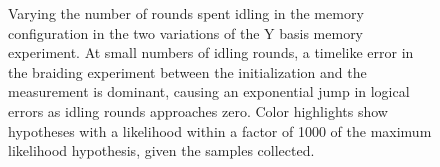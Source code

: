 \documentclass[onecolumn,unpublished,a4paper]{quantumarticle}
\theoremstyle{definition}
\theoremstyle{definition}
\theoremstyle{definition}
\begin{document}
\begin{figure}
    \centering
    \caption{
        Varying the number of rounds spent idling in the memory configuration in the two variations of the Y basis memory experiment.
        At small numbers of idling rounds, a timelike error in the braiding experiment between the initialization and the measurement is dominant, causing an exponential jump in logical errors as idling rounds approaches zero.
        Color highlights show hypotheses with a likelihood within a factor of 1000 of the maximum likelihood hypothesis, given the samples collected.
    }
    \label{fig:braiding_too_fast_error_rate}
\end{figure}
\end{document}
